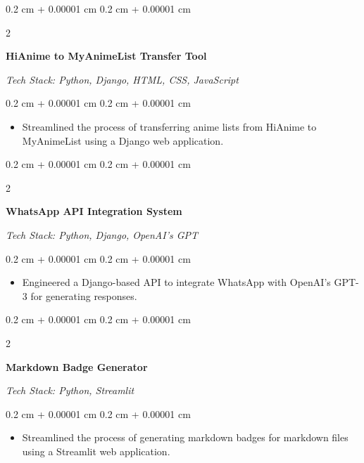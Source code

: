 \documentclass[10pt, a4paper]{article}
\newenvironment{highlights}{
    \begin{itemize}[
        topsep=0.1 cm,
        parsep=0.1 cm,
        partopsep=0pt,
        itemsep=0pt,
        leftmargin=0.4 cm + 10pt
    ]
}{
    \end{itemize}
} %
\newenvironment{onecolentry}{
    \begin{adjustwidth}{
        0.2 cm + 0.00001 cm
    }{
        0.2 cm + 0.00001 cm
    }
}{
    \end{adjustwidth}
} %
\newenvironment{twocolentry}[2][]{
    \onecolentry
    \def\secondColumn{#2}
    \begin{paracol}{2}
}{
    \switchcolumn \raggedleft \secondColumn
    \end{paracol}
    \endonecolentry
} %
\newcommand{\createpointblock}[5]{%
    \begin{twocolentry}{%
        \textit{#2}

        \textit{#4}}
        \textbf{#1}

        \textit{#3}
    \end{twocolentry}

    \vspace{0.1 cm}
    \begin{onecolentry}
        \begin{highlights}
            #5
        \end{highlights}
    \end{onecolentry}
}
\let\hrefWithoutArrow\href
\renewcommand{\href}[2]{\hrefWithoutArrow{#1}{\ifthenelse{\equal{#2}{}}{ }{#2 }\raisebox{.15ex}{\footnotesize \faExternalLink*}}}
\begin{document}
    \vspace{0.2 cm}

    \createpointblock{HiAnime to MyAnimeList Transfer Tool\href{https://github.com/abdbbdii/hianime-to-myanimelist}{}}{}
    {Tech Stack: Python, Django, HTML, CSS, JavaScript}{}
    {%
        \item Streamlined the process of transferring anime lists from HiAnime to MyAnimeList using a Django web application.
    }

    \vspace{0.2 cm}



    \createpointblock{WhatsApp API Integration System\href{https://github.com/abdbbdii/Whatsapp_API}{}}{}
    {Tech Stack: Python, Django, OpenAI's GPT}{}
    {%
        \item Engineered a Django-based API to integrate WhatsApp with OpenAI's GPT-3 for generating responses.
    }

    \vspace{0.2 cm}

    \createpointblock{Markdown Badge Generator\href{https://github.com/abdbbdii/Markdown-badge-generator}{}}{}
    {Tech Stack: Python, Streamlit}{}
    {%
        \item Streamlined the process of generating markdown badges for markdown files using a Streamlit web application.
    }

    \vspace{0.2 cm}



\end{document}
